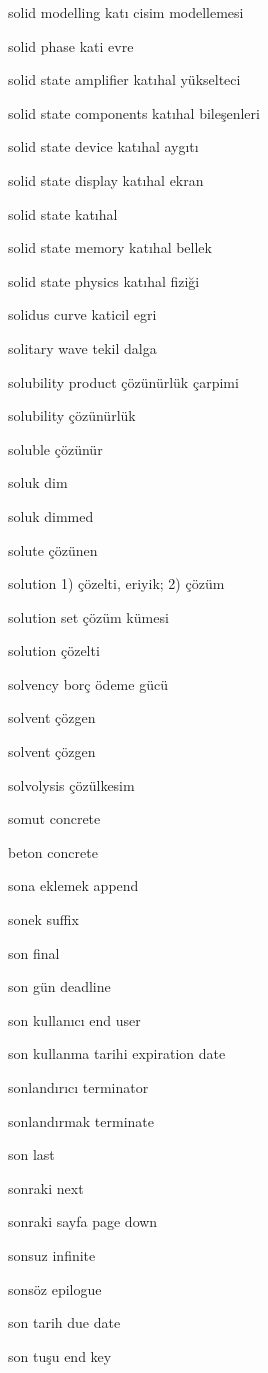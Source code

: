 \documentclass[12pt,fleqn]{article}\usepackage{../../common}
\begin{document}
solid modelling katı cisim modellemesi

solid phase kati evre

solid state amplifier katıhal yükselteci

solid state components katıhal bileşenleri

solid state device katıhal aygıtı

solid state display katıhal ekran

solid state katıhal

solid state memory katıhal bellek

solid state physics katıhal fiziği

solidus curve katicil egri

solitary wave tekil dalga

solubility product çözünürlük çarpimi

solubility çözünürlük

soluble çözünür

soluk dim

soluk dimmed

solute çözünen

solution 1) çözelti, eriyik; 2) çözüm

solution set çözüm kümesi

solution çözelti

solvency borç ödeme gücü

solvent çözgen

solvent çözgen

solvolysis çözülkesim

somut concrete

beton concrete

sona eklemek append

sonek suffix

son final

son gün deadline

son kullanıcı end user

son kullanma tarihi expiration date

sonlandırıcı terminator

sonlandırmak terminate

son last

sonraki next

sonraki sayfa page down

sonsuz infinite

sonsöz epilogue

son tarih due date

son tuşu end key
\end{document}
